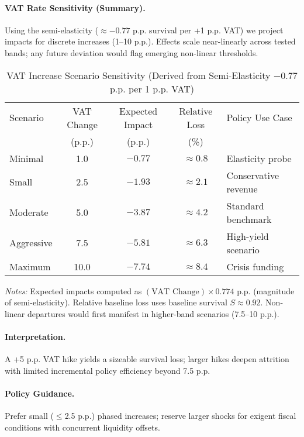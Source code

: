 \paragraph{VAT Rate Sensitivity (Summary).} Using the semi-elasticity ($\approx -0.77$ p.p. survival per +1 p.p. VAT) we project impacts for discrete increases (1--10 p.p.). Effects scale near-linearly across tested bands; any future deviation would flag emerging non-linear thresholds.

\begin{table}[htbp]
\centering
\small
\caption{VAT Increase Scenario Sensitivity (Derived from Semi-Elasticity $-0.77$ p.p. per 1 p.p. VAT)}
\label{tab:vat_sensitivity}
\setlength{\tabcolsep}{3pt}
\renewcommand{\arraystretch}{1.1}
\begin{tabular}{l c c c l}
\toprule
Scenario & VAT Change & Expected Impact & Relative Loss & Policy Use Case \\
 & (p.p.) & (p.p.) & (\%) &  \\
\midrule
Minimal & 1.0 & $-0.77$ & $\approx0.8$ & Elasticity probe \\
Small & 2.5 & $-1.93$ & $\approx2.1$ & Conservative revenue \\
Moderate & 5.0 & $-3.87$ & $\approx4.2$ & Standard benchmark \\
Aggressive & 7.5 & $-5.81$ & $\approx6.3$ & High-yield scenario \\
Maximum & 10.0 & $-7.74$ & $\approx8.4$ & Crisis funding \\
\bottomrule
\end{tabular}
\vspace{2mm}

\vspace{3mm}
\footnotesize \textit{Notes:} Expected impacts computed as $(\text{VAT Change}) \times 0.774$ p.p. (magnitude of semi-elasticity). Relative baseline loss uses baseline survival $S\approx0.92$. Non-linear departures would first manifest in higher-band scenarios (7.5--10 p.p.).
\end{table}



\paragraph{Interpretation.} A +5 p.p. VAT hike yields a sizeable survival loss; larger hikes deepen attrition with limited incremental policy efficiency beyond 7.5 p.p.

\paragraph{Policy Guidance.} Prefer small ($\leq$2.5 p.p.) phased increases; reserve larger shocks for exigent fiscal conditions with concurrent liquidity offsets.

